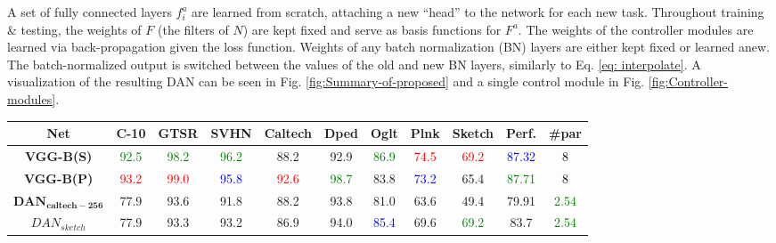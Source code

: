 \documentclass[10pt,journal,compsoc]{IEEEtran}
\begin{document}
A set of fully connected layers $f_{i}^{a}$ are learned from scratch,
attaching a new ``head'' to the network for each new task. Throughout
training \& testing, the weights of $F$ (the filters of $N$) are
kept fixed and serve as basis functions for $F^{a}$. The weights
of the controller modules are learned via back-propagation given the
loss function. Weights of any batch normalization (BN) layers are
either kept fixed or learned anew. The batch-normalized output is
switched between the values of the old and new BN layers, similarly
to Eq. \ref{eq: interpolate}. A visualization of the resulting DAN
can be seen in Fig. \ref{fig:Summary-of-proposed} and a single control
module in Fig. \ref{fig:Controller-modules}. 
\begin{center}
\begin{table*}
\begin{centering}{\small{}}%
\begin{tabular}[t]{ccccccccc||c|c}{\small{}Net} & {\small{}C-10 } & {\small{}GTSR } & {\small{}SVHN } & {\small{}Caltech } & {\small{}Dped } & {\small{}Oglt } & {\small{}Plnk } & \multicolumn{1}{c}{{\small{}Sketch }} & \multicolumn{1}{c}{{\small{}Perf.}} & {\small{}\#par}\tabularnewline
\hline 
\textbf{\small{}VGG-B(S)} & \textcolor{green}{\small{}92.5}{\small{} } & \textcolor{green}{\small{}98.2}{\small{} } & \textcolor{green}{\small{}96.2}{\small{} } & {\small{}88.2 } & {\small{}92.9 } & \textcolor{green}{\small{}86.9}{\small{} } & \textcolor{red}{\small{}74.5}{\small{} } & \textcolor{red}{\small{}69.2}{\small{} } & \textcolor{blue}{\small{}87.32}{\small{} } & \textcolor{black}{\small{}8}\tabularnewline
\hline 
\textbf{\small{}VGG-B(P)} & \textcolor{red}{\small{}93.2}{\small{} } & \textcolor{red}{\small{}99.0}{\small{} } & \textcolor{blue}{\small{}95.8}{\small{} } & \textcolor{red}{\small{}92.6}{\small{} } & \textcolor{green}{\small{}98.7}{\small{} } & {\small{}83.8 } & \textcolor{blue}{\small{}73.2}{\small{} } & {\small{}65.4 } & \textcolor{green}{\small{}87.71}{\small{} } & \textcolor{black}{\small{}8}\tabularnewline
\hline 
\textbf{\small{}$\mathbf{DAN}_{\mathbf{caltech-256}}$} & {\small{}77.9 } & {\small{}93.6 } & {\small{}91.8 } & {\small{}88.2 } & {\small{}93.8 } & {\small{}81.0 } & {\small{}63.6 } & {\small{}49.4 } & {\small{}79.91 } & \textcolor{green}{\small{}2.54}\tabularnewline
\hline 
\textbf{\small{}$DAN_{sketch}$} & {\small{}77.9 } & {\small{}93.3 } & {\small{}93.2 } & {\small{}86.9 } & {\small{}94.0 } & \textcolor{blue}{\small{}85.4}{\small{} } & {\small{}69.6 } & \textcolor{green}{\small{}69.2}{\small{} } & {\small{}83.7 } & \textcolor{green}{\small{}2.54}\tabularnewline

\end{tabular}
\end{centering}
\end{table*}
\end{center}
\end{document}
